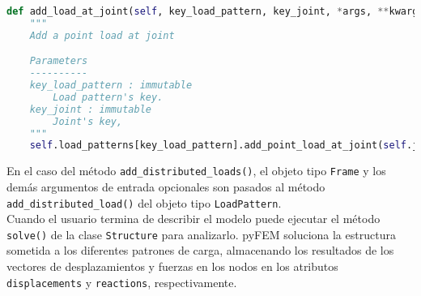\begin{lstlisting}[language=Python,caption=Método \texttt{add\_load\_at\_joint()} de la clase \texttt{Structure}.,label=alg:Structure-add_load_at_joint, frame=single]
def add_load_at_joint(self, key_load_pattern, key_joint, *args, **kwargs):
    """
    Add a point load at joint

    Parameters
    ----------
    key_load_pattern : immutable
        Load pattern's key.
    key_joint : immutable
        Joint's key,
    """
    self.load_patterns[key_load_pattern].add_point_load_at_joint(self.joints[key_joint], *args, **kwargs)
\end{lstlisting}
\bigskip
En el caso del método \verb|add_distributed_loads()|, el objeto tipo \verb|Frame| y los demás argumentos de entrada opcionales son pasados al método \verb|add_distributed_load()| del objeto tipo \verb|LoadPattern|.\\

Cuando el usuario termina de describir el modelo puede ejecutar el método \verb|solve()| de la clase \verb|Structure| para analizarlo. pyFEM soluciona la estructura sometida a los diferentes patrones de carga, almacenando los resultados de los vectores de desplazamientos y fuerzas en los nodos en los atributos \verb|displacements| y \verb|reactions|, respectivamente.\\




